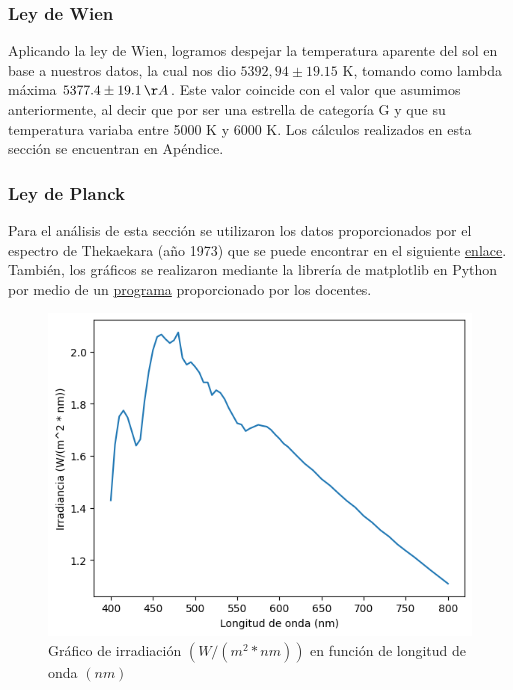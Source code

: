 \documentclass[11pt, a4paper]{article}
\begin{document}
\subsubsection{Ley de Wien}
Aplicando la ley de Wien, logramos despejar la temperatura aparente del sol en base a nuestros datos, la cual nos dio $5392,94 \pm 19.15$ K, tomando como lambda máxima $5377.4 \pm 19.1 \, \AA$. Este valor coincide con el valor que asumimos anteriormente, al decir que por ser una estrella de categoría G y que su temperatura variaba entre 5000 K y 6000 K.
Los cálculos realizados en esta sección se encuentran en Apéndice. 

\subsubsection{Ley de Planck}
Para el análisis de esta sección se utilizaron los datos proporcionados por el espectro de Thekaekara (año 1973) que se puede encontrar en el siguiente \href{https://www.nrel.gov/grid/solar-resource/assets/data/thekaekara.txt}{enlace}. También, los gráficos se realizaron mediante la librería de matplotlib en Python por medio de un \href{https://colab.research.google.com/drive/17XQ6ux3qzL6OkIsI6bAN3YS1U75l0VIM?usp=sharing}{programa} proporcionado por los docentes. 

\begin{figure}[H]
    \centering
    \includegraphics[width=1\linewidth]{images/Copy of grafico_simple_planck.png}
    \captionsetup{justification=centering}
    \caption{Gráfico de irradiación $(W/(m^2*nm))$ en función de longitud de onda $(nm)$}
    \label{fig:planck-1}
\end{figure}
\end{document}
